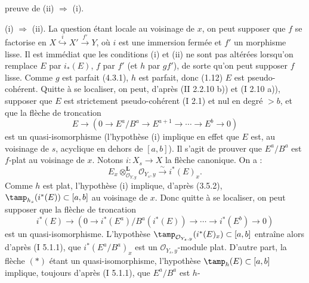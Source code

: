 preuve de (ii) \(\Longrightarrow\) (i).

(i) \(\Longrightarrow\) (ii). La question étant locale au voisinage de \(x\), on peut supposer que \(f\) se factorise en \(X\overset{i}{\hookrightarrow}X'\overset{f'}{\longrightarrow}Y\), où \(i\) est une immersion fermée et \(f'\) un morphisme lisse. Il est immédiat que les conditions (i) et (ii) ne sont pas altérées lorsqu'on remplace \(E\) par \(i_*(E)\), \(f\) par \(f'\) (et \(h\) par \(gf'\)), de sorte qu'on peut supposer \(f\) lisse. Comme \(g\) est parfait (4.3.1), \(h\) est parfait, donc (1.12) \(E\) est pseudo-cohérent. Quitte à se localiser, on peut, d'après (II 2.2.10 b)) et (I 2.10 a)), supposer que \(E\) est strictement pseudo-cohérent (I 2.1) et nul en degré \(>b\), et que la flèche de troncation
\begin{equation}
 E\longrightarrow(0\longrightarrow E^a/B^a\longrightarrow E^{a+1}\longrightarrow\cdots\longrightarrow E^b\longrightarrow0)\tag{$t$}
\end{equation}
est un quasi-isomorphisme (l'hypothèse (i) implique en effet que \(E\) est, au voisinage de \(s\), acyclique en dehors de \([a,b]\)). Il s'agit de prouver que \(E^a/B^a\) est \(f\)-plat au voisinage de \(x\). Notons \(i:X_s\longrightarrow X\) la flèche canonique. On a :
\begin{equation}
 E_x\otimes_{\mathcal O_{Y,y}}^{\mathbf L}\mathcal O_{Y_s,y}\xrightarrow{\sim}i^*(E)_x.\tag{$*$}
\end{equation}
Comme \(h\) est plat, l'hypothèse (i) implique, d'après (3.5.2), \(\tamp_{h_s}(i^*(E))\subset[a,b]\) au voisinage de \(x\). Donc quitte à se localiser, on peut supposer que la flèche de troncation
\begin{equation}
 i^*(E)\longrightarrow(0\longrightarrow i^*(E^a)/B^a(i^*(E))\longrightarrow\cdots\longrightarrow i^*(E^b)\longrightarrow0)\tag{$i^*(t)$}
\end{equation}
est un quasi-isomorphisme. L'hypothèse \(\tamp_{\mathcal O_{Y_s,y}}(i^*(E)_x)\subset[a,b]\) entraîne alors d'après (I 5.1.1), que \(i^*(E^a/B^a)_x\) est un \(\mathcal O_{Y_s,y}\)-module plat. D'autre part, la flèche \((*)\) étant un quasi-isomorphisme, l'hypothèse \(\tamp_h(E)\subset[a,b]\) implique, toujours d'après (I 5.1.1), que \(E^a/B^a\) est \(h\)-
